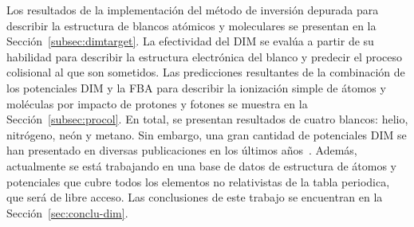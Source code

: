 Los resultados de la implementación del método de inversión depurada 
para describir la estructura de blancos atómicos y moleculares se 
presentan en la Sección~\ref{subsec:dimtarget}. La efectividad del DIM 
se evalúa a partir de su habilidad para describir la estructura 
electrónica del blanco y predecir el proceso colisional al que son 
sometidos. Las predicciones resultantes de la combinación de los 
potenciales DIM y la FBA para describir la ionización simple de átomos y 
moléculas por impacto de protones y fotones se muestra en la 
Sección~\ref{subsec:procol}. En total, se presentan 
resultados de cuatro blancos: helio, nitrógeno, neón y metano. Sin 
embargo, una gran cantidad de potenciales DIM se han presentado en 
diversas publicaciones en los últimos años~\cite{Mendez:16,Mendez:19dim,
Mendez:18}. Además, actualmente se está trabajando en una base de datos 
de estructura de átomos y potenciales que cubre todos los elementos no 
relativistas de la tabla periodica, que será de libre acceso. 
Las conclusiones de este trabajo se encuentran en la 
Sección~\ref{sec:conclu-dim}.

